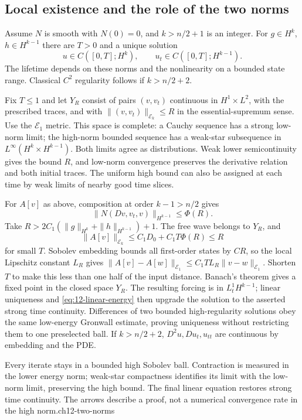 \subsection{Local existence and the role of the two norms}
\begin{theorem}
Assume $N$ is smooth with $N(0)=0$, and $k>n/2+1$ is an integer.
For $g\in H^k$, $h\in H^{k-1}$ there are $T>0$ and a unique solution
\[
 u\in C([0,T];H^k),\qquad u_t\in C([0,T];H^{k-1}).
\]
The lifetime depends on these norms and the nonlinearity on a bounded
state range. Classical $C^2$ regularity follows if $k>n/2+2$.
\end{theorem}
\begin{expandedproof}
Fix $T\le1$ and let $Y_R$ consist of pairs $(v,v_t)$ continuous in
$H^1\times L^2$, with the prescribed traces, and with
$\|(v,v_t)\|_{\mathcal E_k}\le R$ in the essential-supremum sense.
Use the $\mathcal E_1$ metric. This space is complete: a Cauchy
sequence has a strong low-norm limit; the high-norm bounded sequence
has a weak-star subsequence in $L^\infty(H^k\times H^{k-1})$.
Both limits agree as distributions. Weak lower semicontinuity gives
the bound $R$, and low-norm convergence preserves the derivative
relation and both initial traces. The uniform high bound can also
be assigned at each time by weak limits of nearby good time slices.

For $A[v]$ as above, composition at order $k-1>n/2$ gives
\[
 \|N(Dv,v_t,v)\|_{H^{k-1}}\le\Phi(R).
\]
Take $R>2C_1(\|g\|_{H^k}+\|h\|_{H^{k-1}})+1$.
The free wave belongs to $Y_R$, and
\[
 \|A[v]\|_{\mathcal E_k}\le C_1D_0+C_1T\Phi(R)\le R
\]
for small $T$. Sobolev embedding bounds all first-order states by
$C R$, so the local Lipschitz constant $L_R$ gives
$\|A[v]-A[w]\|_{\mathcal E_1}\le C_1TL_R\|v-w\|_{\mathcal E_1}$.
Shorten $T$ to make this less than one half of the input distance.
Banach's theorem gives a fixed point in the closed space $Y_R$.
The resulting forcing is in $L^1_tH^{k-1}$; linear uniqueness and
\eqref{eq:12-linear-energy} then upgrade the solution to the asserted
strong time continuity. Differences of two bounded high-regularity
solutions obey the same low-energy Gronwall estimate, proving uniqueness
without restricting them to one preselected ball. If $k>n/2+2$,
$D^2u,Du_t,u_{tt}$ are continuous by embedding and the PDE.
\end{expandedproof}
{Every iterate stays in a bounded high Sobolev ball. Contraction is measured
in the lower energy norm; weak-star compactness identifies its limit with
the low-norm limit, preserving the high bound. The final linear equation
restores strong time continuity. The arrows describe a proof, not a
numerical convergence rate in the high norm.}{ch12-two-norms}
